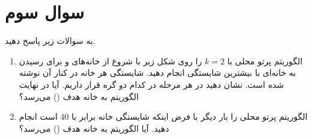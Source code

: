 \documentclass[a4paper,10pt]{article}
\begin{document}
\section{\textcolor{AccentGold}{سوال سوم}}

به سوالات زیر پاسخ دهید.

\begin{enumerate}
	\item[(الف)] الگوریتم پرتو محلی با $k=2$ را روی شکل زیر با شروع از خانه‌های  و  برای رسیدن به خانه‌ای با بیشترین شایستگی انجام دهید. شایستگی هر خانه در کنار آن نوشته شده است. نشان دهید در هر مرحله در کدام دو گره قرار داریم. آیا در نهایت الگوریتم به خانه هدف () می‌رسد؟
	
	\item[(ب)] الگوریتم پرتو محلی را بار دیگر با فرض اینکه شایستگی خانه  برابر با $40$ است انجام دهید. آیا الگوریتم به خانه هدف () می‌رسد؟
\end{enumerate}
\end{document}
